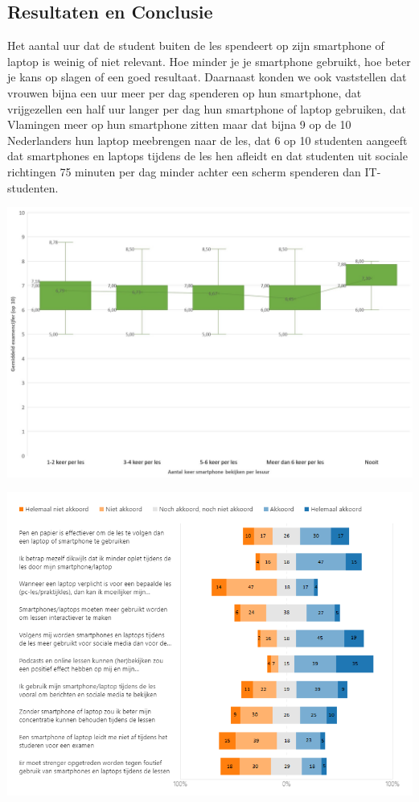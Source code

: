 \documentclass[a0,portrait]{a0poster}
\begin{document}
\begin{multicols}{2}
\section*{Resultaten en Conclusie}
\color{black}
Het aantal uur dat de student buiten de les
spendeert op zijn smartphone of laptop is weinig of niet relevant. Hoe minder je je
smartphone gebruikt, hoe beter je kans op slagen of een goed resultaat. Daarnaast konden
we ook vaststellen dat vrouwen bijna een uur meer per dag spenderen op hun smartphone,
dat vrijgezellen een half uur langer per dag hun smartphone of laptop gebruiken, dat
Vlamingen meer op hun smartphone zitten maar dat bijna 9 op de 10 Nederlanders hun
laptop meebrengen naar de les, dat 6 op 10 studenten aangeeft dat smartphones en laptops
tijdens de les hen afleidt en dat studenten uit sociale richtingen 75 minuten per dag minder
achter een scherm spenderen dan IT-studenten.
\begin{center}\vspace{1cm}
	\includegraphics[scale=0.8]{Boxplot1.jpg}
\end{center}\vspace{1cm}
\begin{center}\vspace{1cm}
	\includegraphics[scale=1.3]{stellingen.png}

\end{center}
\end{multicols}
\end{document}
